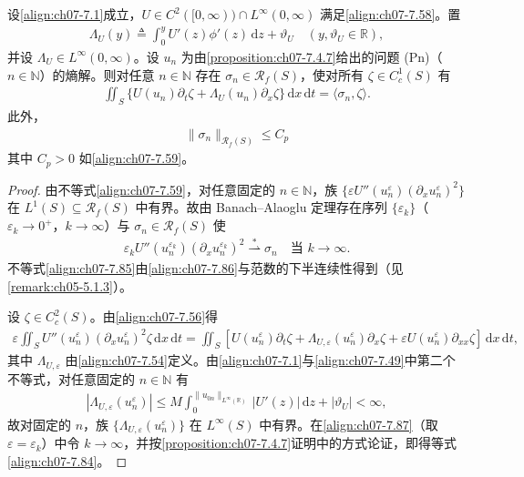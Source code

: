 ﻿\documentclass[../../main.tex]{subfiles}%
\begin{document}
\begin{lemma}\label{lemma:ch07-7.4.8}
设\eqref{align:ch07-7.1}成立，$U\in C^2([0,\infty))\cap L^\infty(0,\infty)$ 满足\eqref{align:ch07-7.58}。置
\begin{align}
\Lambda_U(y)\triangleq\int_0^yU'(z)\phi'(z)\,\mathrm{d}z+\vartheta_U\quad(y,\vartheta_U\in\mathbb{R}), \label{align:ch07-7.83}
\end{align}
并设 $\Lambda_U\in L^\infty(0,\infty)$。设 $u_n$ 为由\cref{proposition:ch07-7.4.7}给出的问题 (Pn)（$n\in\mathbb{N}$）的熵解。则对任意 $n\in\mathbb{N}$ 存在 $\sigma_n\in\mathscr{R}_f(S)$，使对所有 $\zeta\in C^1_c(S)$ 有
\begin{align}
\iint_S\{U(u_n)\partial_t\zeta+\Lambda_U(u_n)\partial_x\zeta\}\,\mathrm{d}x\,\mathrm{d}t=\langle\sigma_n,\zeta\rangle. \label{align:ch07-7.84}
\end{align}
此外，
\begin{align}
\|\sigma_n\|_{\mathscr{R}_f(S)}\leqslant C_p \label{align:ch07-7.85}
\end{align}
其中 $C_p>0$ 如\eqref{align:ch07-7.59}。
\end{lemma}

\begin{proof}
由不等式\eqref{align:ch07-7.59}，对任意固定的 $n\in\mathbb{N}$，族 $\{\varepsilon U''(u_n^\varepsilon)(\partial_xu_n^\varepsilon)^2\}$ 在 $L^1(S)\subseteq\mathscr{R}_f(S)$ 中有界。故由 Banach--Alaoglu 定理存在序列 $\{\varepsilon_k\}$（$\varepsilon_k\to0^+$，$k\to\infty$）与 $\sigma_n\in\mathscr{R}_f(S)$ 使
\begin{align}
\varepsilon_kU''(u_n^{\varepsilon_k})(\partial_xu_n^{\varepsilon_k})^2\stackrel{*}{\rightharpoonup}\sigma_n\quad\text{当 }k\to\infty. \label{align:ch07-7.86}
\end{align}
不等式\eqref{align:ch07-7.85}由\eqref{align:ch07-7.86}与范数的下半连续性得到（见\cref{remark:ch05-5.1.3}）。

设 $\zeta\in C^2_c(S)$。由\eqref{align:ch07-7.56}得
\begin{align}
\varepsilon\iint_SU''(u_n^\varepsilon)(\partial_xu_n^\varepsilon)^2\zeta\,\mathrm{d}x\,\mathrm{d}t
=\iint_S[U(u_n^\varepsilon)\partial_t\zeta+\Lambda_{U,\varepsilon}(u_n^\varepsilon)\partial_x\zeta+\varepsilon U(u_n^\varepsilon)\partial_{xx}\zeta]\,\mathrm{d}x\,\mathrm{d}t, \label{align:ch07-7.87}
\end{align}
其中 $\Lambda_{U,\varepsilon}$ 由\eqref{align:ch07-7.54}定义。由\eqref{align:ch07-7.1}与\eqref{align:ch07-7.49}中第二个不等式，对任意固定的 $n\in\mathbb{N}$ 有
\begin{align*}
|\Lambda_{U,\varepsilon}(u_n^\varepsilon)|\leqslant M\int_0^{\|u_{0n}\|_{L^\infty(\mathbb{R})}}|U'(z)|\,\mathrm{d}z+|\vartheta_U|<\infty,
\end{align*}
故对固定的 $n$，族 $\{\Lambda_{U,\varepsilon}(u_n^\varepsilon)\}$ 在 $L^\infty(S)$ 中有界。在\eqref{align:ch07-7.87}（取 $\varepsilon=\varepsilon_k$）中令 $k\to\infty$，并按\cref{proposition:ch07-7.4.7}证明中的方式论证，即得等式\eqref{align:ch07-7.84}。
\end{proof}
\end{document}
